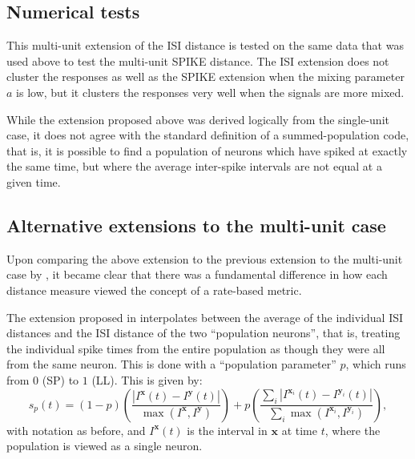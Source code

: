 \subsection{Numerical tests}
This multi-unit extension of the ISI distance is tested on the same data that was used above to test the multi-unit SPIKE distance. The ISI extension does not cluster the responses as well as the SPIKE extension when the mixing parameter $a$ is low, but it clusters the responses very well when the signals are more mixed.

While the extension proposed above was derived logically from the single-unit case, it does not agree with the standard definition of a summed-population code, that is, it is possible to find a population of neurons which have spiked at exactly the same time, but where the average inter-spike intervals are not equal at a given time.

\subsection{Alternative extensions to the multi-unit case}

Upon comparing the above extension to the previous extension to the multi-unit case by \citet{KreuzEtAl2009a}, it became clear that there was a fundamental difference in how each distance measure viewed the concept of a rate-based metric.


The extension proposed in \citep{KreuzEtAl2009a} interpolates between the average of the individual ISI distances and the ISI distance of the two ``population neurons'', that is, treating the individual spike times from the entire population as though they were all from the same neuron.  This is done with a ``population parameter'' $p$, which runs from $0$ (SP) to $1$ (LL).  This is given by:
\begin{equation}
\label{pop}
s_p(t) = (1-p)\left( \frac{ | I^{\mathbf{x}}(t) - I^{\mathbf{y}}(t) |}{ \max (I^{\mathbf{x}},I^{\mathbf{y}})}\right) + p\left( \frac{\sum_i | I^{\mathbf{x}_i}(t) - I^{\mathbf{y}_i}(t) |}{\sum_i \max (I^{\mathbf{x}_i},I^{\mathbf{y}_i})} \right),
\end{equation}
with notation as before, and $I^{\mathbf{x}}(t)$ is the interval in $\mathbf{x}$ at time $t$, where the population is viewed as a single neuron.

%

